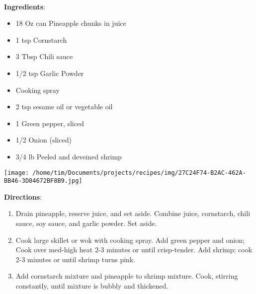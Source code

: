 \documentclass[11pt, twoside, openany]{book}
\begin{document}
 \label{sweet-and-sour-shrimp}\hfill\textit{}\\
\begin{minipage}[t]{0.8\linewidth}
\textbf{Ingredients}:\vspace{-3mm}
\begin{multicols}{2}
\begin{itemize}\setlength\itemsep{-1mm}
\item 18 Oz can Pineapple chunks in juice
\item 1 tsp Cornstarch
\item 3 Tbsp Chili sauce
\item 1/2 tsp Garlic Powder
\item Cooking spray
\item 2 tsp sesame oil or vegetable oil
\item 1 Green pepper, sliced
\item 1/2 Onion (sliced)
\item 3/4 lb Peeled and deveined shrimp
\end{itemize}
\end{multicols}
\end{minipage}
\begin{minipage}[t]{0.2\linewidth}
\centering \strut\vspace*{-\baselineskip}\newline
\texttt{[image: /home/tim/Documents/projects/recipes/img/27C24F74-B2AC-462A-BB46-3D84672BF8B9.jpg]}\\
\end{minipage}\vspace{3mm}
\textbf{Directions}:
\vspace{-3mm}\begin{enumerate}\setlength\itemsep{-1mm}
\item Drain pineapple, reserve juice, and set aside. Combine juice, cornstarch, chili sauce, soy sauce, and garlic powder. Set aside.
\item Cook large skillet or wok with cooking spray. Add green pepper and onion; Cook over med-high heat 2-3 minutes or until crisp-tender. Add shrimp; cook 2-3 minutes or until shrimp turns pink. 
\item Add cornstarch mixture and pineapple to shrimp mixture. Cook, stirring constantly, until mixture is bubbly and thickened.
\end{enumerate}
 \label{moms-chicken-enchiladas}\hfill\textit{}\\
\end{document}
